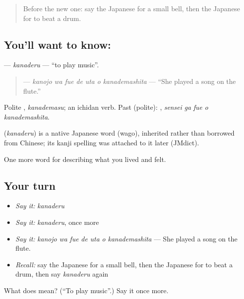 \begin{quote}
Before the new one: say the Japanese for a small bell, then the Japanese for to beat a drum.
\end{quote}

\subsection*{You'll want to know: }
\textbf{} — \emph{kanaderu} — \textquotedblleft{}to play music\textquotedblright{}.

\begin{quote}
\textbf{   } — \emph{kanojo wa fue de uta o kanademashita} — \textquotedblleft{}She played a song on the flute.\textquotedblright{}
\end{quote}

Polite \textbf{}, \emph{kanademasu}; an ichidan verb. Past (polite): \textbf{  }, \emph{sensei ga fue o kanademashita}.

\begin{cousinweb}
\textbf{} (\emph{kanaderu}) is a native Japanese word (wago), inherited rather than borrowed from Chinese; its kanji spelling was attached to it later (JMdict).
\end{cousinweb}

\begin{grammarlens}[title={What you've built}]
One more word for describing what you lived and felt.
\end{grammarlens}

\subsection*{Your turn}
\begin{itemize}
\raggedright
  \item \emph{Say it:} \emph{kanaderu}
  \item \emph{Say it:} \emph{kanaderu}, once more
  \item \emph{Say it:} \emph{kanojo wa fue de uta o kanademashita} — She played a song on the flute.
  \item \emph{Recall:} say the Japanese for a small bell, then the Japanese for to beat a drum, then say \emph{kanaderu} again
\end{itemize}

\begin{tcolorbox}[breakable,colback=teal!4,colframe=teal!35!black,title={Before you move on}]
What does  mean? (\textquotedblleft{}To play music\textquotedblright{}.) Say it once more.
\end{tcolorbox}
